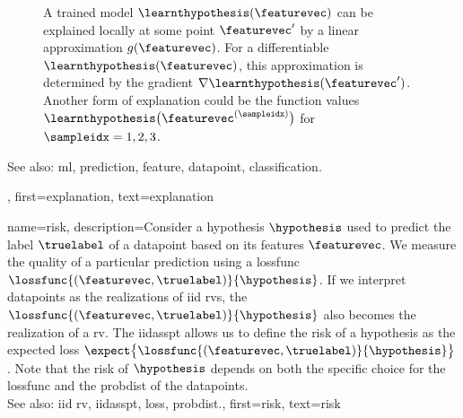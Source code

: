 {{\begin{figure}[H]
\begin{center}
	 	\end{center}
	 	\caption{A trained \gls{model} $\learnthypothesis(\featurevec)$ can be explained 
	     	locally at some point $\featurevec'$ by a linear approximation $g(\featurevec)$. 
	     	For a \gls{differentiable} $\learnthypothesis(\featurevec)$, this approximation is 
	     	determined by the \gls{gradient} $\nabla \learnthypothesis(\featurevec')$. Another 
	     	form of explanation could be the \gls{function} values $\learnthypothesis\big(\featurevec^{(\sampleidx)} \big)$ 
	     	for $\sampleidx=1, 2, 3$. 
		\label{fig_explanation_dict}}
	 	\end{figure} 
		See also: \gls{ml}, \gls{prediction}, \gls{feature}, \gls{datapoint}, \gls{classification}.},
	first={explanation},
	text={explanation} 
}

{name={risk},
	description={Consider a \gls{hypothesis} $\hypothesis$ used to predict the \gls{label} 
		$\truelabel$ of a \gls{datapoint} based on its \glspl{feature} $\featurevec$. We measure 
		the quality of a particular \gls{prediction} using a \gls{lossfunc} $\lossfunc{(\featurevec,\truelabel)}{\hypothesis}$. 
		If we interpret \glspl{datapoint} as the \glspl{realization} of \gls{iid} \glspl{rv}, 
		the $\lossfunc{(\featurevec,\truelabel)}{\hypothesis}$ also becomes the \gls{realization} 
		of a \gls{rv}. The \gls{iidasspt} allows us to define the risk of a \gls{hypothesis} 
		as the expected \gls{loss} $\expect \big\{\lossfunc{(\featurevec,\truelabel)}{\hypothesis} \big\}$. 
		Note that the risk of $\hypothesis$ depends on both the specific choice for the \gls{lossfunc} and the 
		\gls{probdist} of the \glspl{datapoint}.
					\\ 
		See also: \gls{iid} \gls{rv}, \gls{iidasspt}, \gls{loss}, \gls{probdist}.},
	first={risk},
	text={risk} 
}

